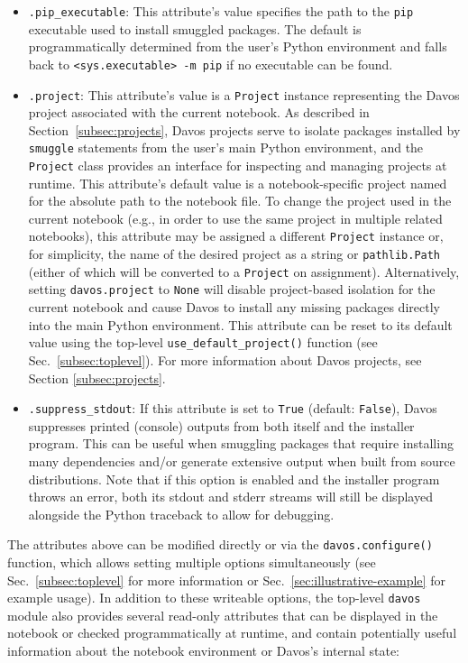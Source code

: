 \documentclass[preprint,12pt,a4paper]{elsarticle}
\begin{document}
\begin{itemize}
\item \texttt{.pip\_executable}: This attribute's value specifies the
  path to the \texttt{pip} executable used to install smuggled
  packages. The default is programmatically determined from the user's Python
  environment and falls back to \texttt{<sys.executable> -m pip} if no
  executable can be found.

\item \texttt{.project}: This attribute's value is a \texttt{Project} instance representing the Davos project associated with the current notebook.
  As described in Section~\ref{subsec:projects}, Davos projects serve to isolate packages installed by \texttt{smuggle} statements from the user's main Python environment, and the \texttt{Project} class provides an interface for inspecting and managing projects at runtime.
  This attribute's default value is a notebook-specific project named for the absolute path to the notebook file.
  To change the project used in the current notebook (e.g., in order to use the same project in multiple related notebooks), this attribute may be assigned a different \texttt{Project} instance or, for simplicity, the name of the desired project as a string or \texttt{pathlib.Path} (either of which will be converted to a \texttt{Project} on assignment).
  Alternatively, setting \texttt{davos.project} to \texttt{None} will disable project-based isolation for the current notebook and cause Davos to install any missing packages directly into the main Python environment.
  This attribute can be reset to its default value using the top-level \texttt{use\_default\_project()} function (see Sec.~\ref{subsec:toplevel}).
  For more information about Davos projects, see Section \ref{subsec:projects}.

\item \texttt{.suppress\_stdout}: If this attribute is set to
  \texttt{True} (default: \texttt{False}), Davos suppresses
  printed (console) outputs from both itself and the installer program.
  This can be useful when smuggling packages that require installing many
  dependencies and/or generate extensive output when built from source
  distributions. Note that if this option is enabled and the installer
  program throws an error, both its stdout and stderr streams will still be
  displayed alongside the Python traceback to allow for debugging.

\end{itemize}

\noindent The attributes above can be modified directly or via the \texttt{davos.configure()} function, which allows setting multiple options simultaneously (see Sec.~\ref{subsec:toplevel} for more information or Sec.~\ref{sec:illustrative-example} for example usage).
In addition to these writeable options, the top-level \texttt{davos} module also provides several read-only attributes that can be displayed in the notebook or checked programmatically at runtime, and contain potentially useful information about the notebook environment or Davos's internal state:
\end{document}
